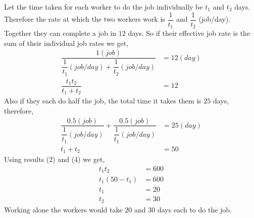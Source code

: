 \begin{solution}
  Let the time taken for each worker to do the job individually be $t_1$ and $t_2$ days. Therefore the rate at which the two workers work is $\dfrac{1}{t_1}$ and $\dfrac{1}{t_2}$ (job/day). \\
  Together they can complete a job in $12$ days. So if their effective job rate is the sum of their individual job rates we get,
  \begin{align}
	\dfrac{1(job)}{\dfrac{1}{t_1}(job/day)+
		\dfrac{1}{t_2}(job/day)} &= 12(day) \\
	\dfrac{t_1t_2}{t_1+t_2}      &= 12
  \end{align}
  Also if they each do half the job, the total time it takes them is $25$ days, therefore,
  \begin{align}
    \dfrac{0.5(job)}{\dfrac{1}{t_1}(job/day)}+
    	\dfrac{0.5(job)}{\dfrac{1}{t_1}(job/day)} &= 25(day) \\
    t_1+t_2                                       &= 50
  \end{align}
  Using results (2) and (4) we get,
  \begin{align}
    t_1t_2      &= 600 \\
    t_1(50-t_1) &= 600 \\
    t_1         &= 20 \\
    t_2         &= 30
  \end{align}
  Working alone the workers would take $20$ and $30$ days each to do the job.

\end{solution}


